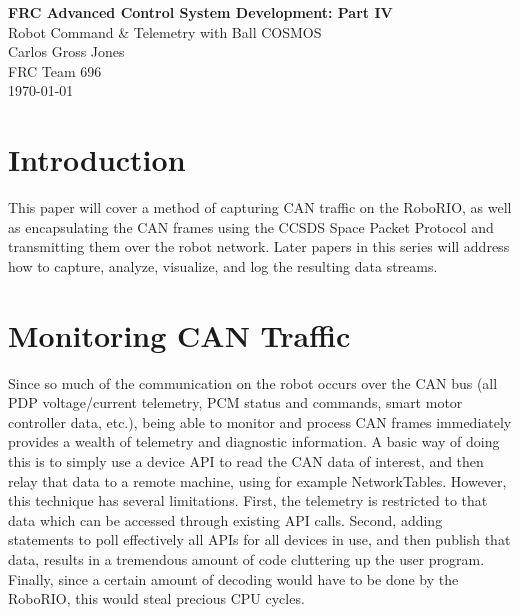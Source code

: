 \documentclass[12pt]{article}
\begin{document}
	\begin{titlepage}
	\begin{center}
		
	
	\vspace*{1in}
	{\Huge \textbf{FRC Advanced Control System Development: Part IV}}\\
	\vspace{0.25in}
	{\LARGE Robot Command \& Telemetry with Ball COSMOS}\\
	\vspace{0.5in}
	{\Large Carlos Gross Jones}\\
	\vspace{0.1in}
	{\Large FRC Team 696}\\
	\vspace{0.1in}
	{\Large \today}\\
\end{center}
	
\end{titlepage}


\section{Introduction}
\par This paper will cover a method of capturing CAN traffic on the RoboRIO, as well as encapsulating the CAN frames using the CCSDS Space Packet Protocol and transmitting them over the robot network. Later papers in this series will address how to capture, analyze, visualize, and log the resulting data streams. 


\section{Monitoring CAN Traffic}
\par Since so much of the communication on the robot occurs over the CAN bus (all PDP voltage/current telemetry, PCM status and commands, smart motor controller data, etc.), being able to monitor and process CAN frames immediately provides a wealth of telemetry and diagnostic information. A basic way of doing this is to simply use a device API to read the CAN data of interest, and then relay that data to a remote machine, using for example NetworkTables. However, this technique has several limitations. First, the telemetry is restricted to that data which can be accessed through existing API calls. Second, adding statements to poll effectively all APIs for all devices in use, and then publish that data, results in a tremendous amount of code cluttering up the user program. Finally, since a certain amount of decoding would have to be done by the RoboRIO, this would steal precious CPU cycles. 
\end{document}
